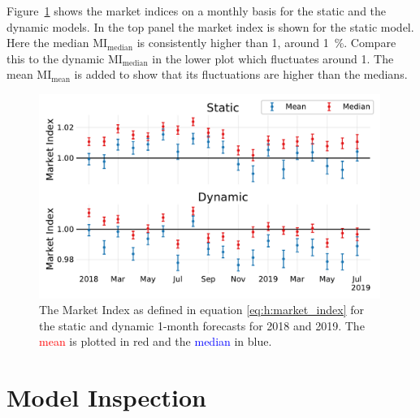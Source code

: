 Figure~\ref{fig:h:forecast_MarketIndex} shows the market indices on a monthly basis for the static and the dynamic models. In the top panel the market index is shown for the static model. Here the median $\mathrm{MI}_\mathrm{median}$  is consistently higher than \num{1}, around \SI{1}{\percent}. Compare this to the dynamic $\mathrm{MI}_\mathrm{median}$ in the lower plot which fluctuates around \num{1}. The mean $\mathrm{MI}_\mathrm{mean}$ is added to show that its fluctuations are higher than the medians. 
\begin{figure}
  \centerfloat
  \includegraphics[width=0.99\textwidth, trim=10 15 10 10, clip]{figures/housing/Ejerlejlighed_v19_cut_all_Ncols_all_xgb_forecast_prediction_MarketIndex.pdf}
  \caption[Market Index based on the Static and Dynamic XGB Forecasts]
          {The Market Index as defined in equation \eqref{eq:h:market_index} for the static and dynamic 1-month forecasts for \num{2018} and \num{2019}. The \textcolor{red}{mean} is plotted in red and the \textcolor{blue}{median} in blue.} 
  \label{fig:h:forecast_MarketIndex}
\end{figure}

\FloatBarrier
\section{Model Inspection}
\label{sec:h:model_inspection}

